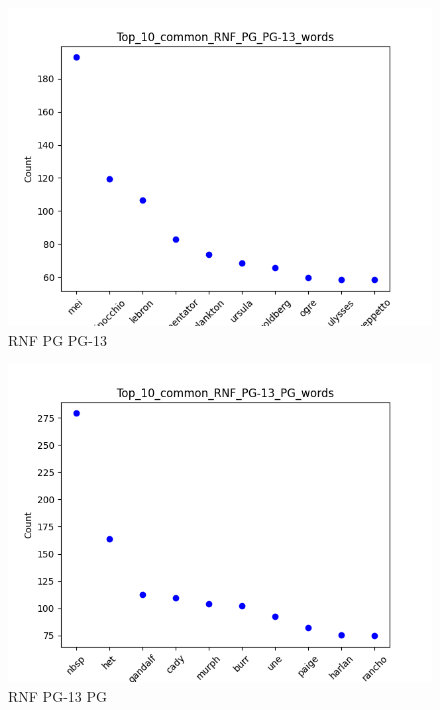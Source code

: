 \documentclass[a4paper]{article}
\begin{document}
\begin{figure}[ht]
    \centering
    \includegraphics[width=1\textwidth]{../stats/Top_10_common_RNF_PG_PG-13_words.png}
    \caption{RNF PG PG-13}
\end{figure}


\begin{figure}[ht]
    \centering
    \includegraphics[width=1\textwidth]{../stats/Top_10_common_RNF_PG-13_PG_words.png}
    \caption{RNF PG-13 PG}
\end{figure}
\end{document}
